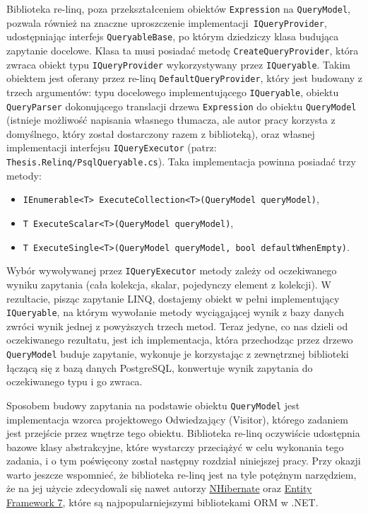 Biblioteka re-linq, poza przekształceniem obiektów \texttt{Expression} na \texttt{QueryModel}, pozwala również na znaczne uproszczenie implementacji \texttt{IQueryProvider}, udostępniając interfejs \texttt{QueryableBase}, po którym dziedziczy klasa budująca zapytanie docelowe. Klasa ta musi posiadać metodę \texttt{CreateQueryProvider}, która zwraca obiekt typu \texttt{IQueryProvider} wykorzystywany przez \texttt{IQueryable}. Takim obiektem jest oferany przez re-linq \texttt{DefaultQueryProvider}, który jest budowany z trzech argumentów: typu docelowego implementującego \texttt{IQueryable}, obiektu \texttt{QueryParser} dokonującego translacji drzewa \texttt{Expression} do obiektu \texttt{QueryModel} (istnieje możliwość napisania własnego tłumacza, ale autor pracy korzysta z domyślnego, który został dostarczony razem z biblioteką), oraz własnej implementacji interfejsu \texttt{IQueryExecutor} (patrz: \texttt{Thesis.Relinq/PsqlQueryable.cs}). Taka implementacja powinna posiadać trzy metody:

\begin{itemize}
\item \texttt{IEnumerable<T> ExecuteCollection<T>(QueryModel queryModel)},
\item \texttt{T ExecuteScalar<T>(QueryModel queryModel)},
\item \texttt{T ExecuteSingle<T>(QueryModel queryModel, bool defaultWhenEmpty)}.
\end{itemize}

Wybór wywoływanej przez \texttt{IQueryExecutor} metody zależy od oczekiwanego wyniku zapytania (cała kolekcja, skalar, pojedynczy element z kolekcji). W rezultacie, pisząc zapytanie LINQ, dostajemy obiekt w pełni implementujący \texttt{IQueryable}, na którym wywołanie metody wyciągającej wynik z bazy danych zwróci wynik jednej z powyższych trzech metod. Teraz jedyne, co nas dzieli od oczekiwanego rezultatu, jest ich implementacja, która przechodząc przez drzewo \texttt{QueryModel} buduje zapytanie, wykonuje je korzystając z zewnętrznej biblioteki łączącą się z bazą danych PostgreSQL, konwertuje wynik zapytania do oczekiwanego typu i go zwraca.

Sposobem budowy zapytania na podstawie obiektu \texttt{QueryModel} jest implementacja wzorca projektowego Odwiedzający (Visitor), którego zadaniem jest przejście przez wnętrze tego obiektu. Biblioteka re-linq oczywiście udostępnia bazowe klasy abstrakcyjne, które wystarczy przeciążyć w celu wykonania tego zadania, i o tym poświęcony został następny rozdział niniejszej pracy. Przy okazji warto jeszcze wspomnieć, że biblioteka re-linq jest na tyle potężnym narzędziem, że na jej użycie zdecydowali się nawet autorzy \href{https://github.com/nhibernate/nhibernate-core/blob/d82d1381fb6b427da91d357398502a7f4b482ccc/src/NHibernate/Linq/NhRelinqQueryParser.cs}{NHibernate} oraz \href{https://github.com/aspnet/EntityFramework/blob/f386095005e46ea3aa4d677e4439cdac113dbfb1/src/EFCore.Relational/Query/ExpressionVisitors/Internal/EqualityPredicateExpandingVisitor.cs}{Entity Framework 7}, które są najpopularniejszymi bibliotekami ORM w .NET.
